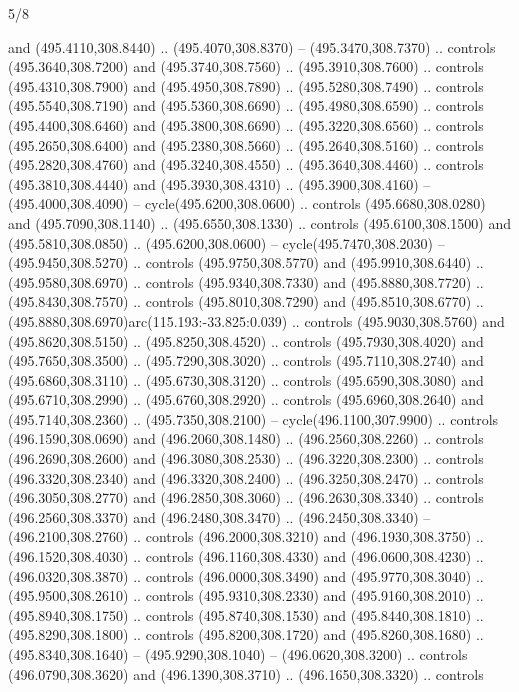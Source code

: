 \begin{flagdescription}{5/8}
\begin{scope}[xshift=0.5\flaglength,yshift=0.5\flagwidth,scale=\flagwidth/475.63]
\begin{scope}[y=0.8pt, x=0.8pt, yscale=-1, xscale=1,shift={(-450,-300)}]
\begin{scope}[cm={{1.0,0.0,0.0,1.0,(-0.0002,0.12556)}},cm={{1.0,0.0,0.0,1.0,(0.00179,0.0)}}]
\begin{scope}[cm={{1.11592,0.0,0.0,1.11592,(-106.89933,-41.77764)}}]
\begin{scope}[draw=black,fill=cfff]
\begin{scope}[fill=black]
  and (495.4110,308.8440) .. (495.4070,308.8370) -- (495.3470,308.7370) ..
  controls (495.3640,308.7200) and (495.3740,308.7560) .. (495.3910,308.7600) ..
  controls (495.4310,308.7900) and (495.4950,308.7890) .. (495.5280,308.7490) ..
  controls (495.5540,308.7190) and (495.5360,308.6690) .. (495.4980,308.6590) ..
  controls (495.4400,308.6460) and (495.3800,308.6690) .. (495.3220,308.6560) ..
  controls (495.2650,308.6400) and (495.2380,308.5660) .. (495.2640,308.5160) ..
  controls (495.2820,308.4760) and (495.3240,308.4550) .. (495.3640,308.4460) ..
  controls (495.3810,308.4440) and (495.3930,308.4310) .. (495.3900,308.4160) --
  (495.4000,308.4090) -- cycle(495.6200,308.0600) .. controls
  (495.6680,308.0280) and (495.7090,308.1140) .. (495.6550,308.1330) .. controls
  (495.6100,308.1500) and (495.5810,308.0850) .. (495.6200,308.0600) --
  cycle(495.7470,308.2030) -- (495.9450,308.5270) .. controls
  (495.9750,308.5770) and (495.9910,308.6440) .. (495.9580,308.6970) .. controls
  (495.9340,308.7330) and (495.8880,308.7720) .. (495.8430,308.7570) .. controls
  (495.8010,308.7290) and (495.8510,308.6770) ..
  (495.8880,308.6970)arc(115.193:-33.825:0.039) .. controls (495.9030,308.5760)
  and (495.8620,308.5150) .. (495.8250,308.4520) .. controls (495.7930,308.4020)
  and (495.7650,308.3500) .. (495.7290,308.3020) .. controls (495.7110,308.2740)
  and (495.6860,308.3110) .. (495.6730,308.3120) .. controls (495.6590,308.3080)
  and (495.6710,308.2990) .. (495.6760,308.2920) .. controls (495.6960,308.2640)
  and (495.7140,308.2360) .. (495.7350,308.2100) -- cycle(496.1100,307.9900) ..
  controls (496.1590,308.0690) and (496.2060,308.1480) .. (496.2560,308.2260) ..
  controls (496.2690,308.2600) and (496.3080,308.2530) .. (496.3220,308.2300) ..
  controls (496.3320,308.2340) and (496.3320,308.2400) .. (496.3250,308.2470) ..
  controls (496.3050,308.2770) and (496.2850,308.3060) .. (496.2630,308.3340) ..
  controls (496.2560,308.3370) and (496.2480,308.3470) .. (496.2450,308.3340) --
  (496.2100,308.2760) .. controls (496.2000,308.3210) and (496.1930,308.3750) ..
  (496.1520,308.4030) .. controls (496.1160,308.4330) and (496.0600,308.4230) ..
  (496.0320,308.3870) .. controls (496.0000,308.3490) and (495.9770,308.3040) ..
  (495.9500,308.2610) .. controls (495.9310,308.2330) and (495.9160,308.2010) ..
  (495.8940,308.1750) .. controls (495.8740,308.1530) and (495.8440,308.1810) ..
  (495.8290,308.1800) .. controls (495.8200,308.1720) and (495.8260,308.1680) ..
  (495.8340,308.1640) -- (495.9290,308.1040) -- (496.0620,308.3200) .. controls
  (496.0790,308.3620) and (496.1390,308.3710) .. (496.1650,308.3320) .. controls

\end{scope}
\end{scope}
\end{scope}
\end{scope}
\end{scope}
\end{scope}
\end{flagdescription}
